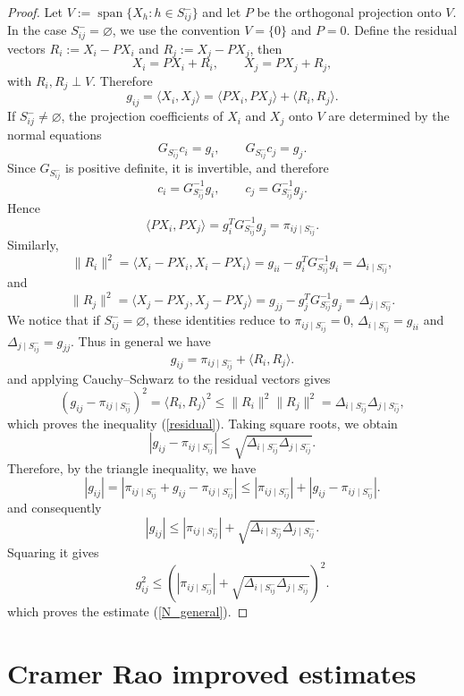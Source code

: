 \documentclass[11pt]{article}
\begin{document}
\begin{proof}
Let $V:=\operatorname{span}\{X_h:h\in S^{-}_{ij}\}$ and let $P$ be the orthogonal projection onto $V$. In the case $S^{-}_{ij}=\varnothing$, we use the convention $V=\{0\}$ and $P=0$. Define the residual vectors $R_i:=X_i-PX_i$ and $R_j:=X_j-PX_j$, then
$$
X_i=PX_i+R_i,
\qquad
X_j=PX_j+R_j,
$$
with $R_i,R_j\perp V$. Therefore
$$
g_{ij}
=
\langle X_i,X_j\rangle
=
\langle PX_i,PX_j\rangle
+
\langle R_i,R_j\rangle .
$$
If $S^{-}_{ij}\neq\varnothing$, the projection coefficients of $X_i$ and $X_j$ onto $V$ are determined by the normal equations
$$
G_{S^{-}_{ij}}c_i=g_i,
\qquad
G_{S^{-}_{ij}}c_j=g_j.
$$
Since $G_{S^{-}_{ij}}$ is positive definite, it is invertible, and therefore
$$
c_i=G_{S^{-}_{ij}}^{-1}g_i,
\qquad
c_j=G_{S^{-}_{ij}}^{-1}g_j.
$$
Hence
$$
\langle PX_i,PX_j\rangle
=
g_i^TG_{S^{-}_{ij}}^{-1}g_j
=
\pi_{ij\mid S^{-}_{ij}}.
$$
Similarly,
$$
\|R_i\|^2
=
\langle X_i-PX_i,X_i-PX_i\rangle
=
g_{ii}-g_i^TG_{S^{-}_{ij}}^{-1}g_i
=
\Delta_{i\mid S^{-}_{ij}},
$$
and
$$
\|R_j\|^2
=
\langle X_j-PX_j,X_j-PX_j\rangle
=
g_{jj}-g_j^TG_{S^{-}_{ij}}^{-1}g_j
=
\Delta_{j\mid S^{-}_{ij}}.
$$
We notice that if $S^{-}_{ij}=\varnothing$, these identities reduce to $\pi_{ij\mid S^{-}_{ij}}=0$, $\Delta_{i\mid S^{-}_{ij}}=g_{ii}$ and $\Delta_{j\mid S^{-}_{ij}}=g_{jj}$.
Thus in general we have
$$
g_{ij}
=
\pi_{ij\mid S^{-}_{ij}}
+
\langle R_i,R_j\rangle .
$$
and applying Cauchy--Schwarz to the residual vectors gives
$$
\left(
g_{ij}-\pi_{ij\mid S^{-}_{ij}}
\right)^2
=
\langle R_i,R_j\rangle^2
\leq
\|R_i\|^2\|R_j\|^2
=
\Delta_{i\mid S^{-}_{ij}}\Delta_{j\mid S^{-}_{ij}},
$$
which proves the inequality (\ref{residual}). Taking square roots, we obtain
$$
|g_{ij}-\pi_{ij\mid S^{-}_{ij}}|
\leq
\sqrt{
\Delta_{i\mid S^{-}_{ij}}\Delta_{j\mid S^{-}_{ij}}
}.
$$
Therefore, by the triangle inequality, we have
$$
|g_{ij}|
=
\left|
\pi_{ij\mid S^{-}_{ij}}
+
g_{ij}-\pi_{ij\mid S^{-}_{ij}}
\right|
\leq
|\pi_{ij\mid S^{-}_{ij}}|
+
|g_{ij}-\pi_{ij\mid S^{-}_{ij}}|.
$$
and consequently
$$
|g_{ij}|
\leq
|\pi_{ij\mid S^{-}_{ij}}|
+
\sqrt{
\Delta_{i\mid S^{-}_{ij}}\Delta_{j\mid S^{-}_{ij}}
}.
$$
Squaring it gives
$$
g_{ij}^2
\leq
\left(
|\pi_{ij\mid S^{-}_{ij}}|
+
\sqrt{
\Delta_{i\mid S^{-}_{ij}}\Delta_{j\mid S^{-}_{ij}}
}
\right)^2.
$$
which proves the  estimate (\ref{N_general}).
\end{proof}
\section{Cramer Rao improved estimates}
\end{document}
